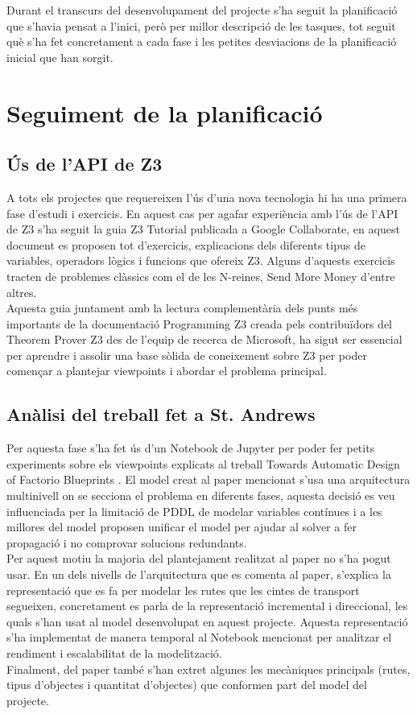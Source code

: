 Durant el transcurs del desenvolupament del projecte s'ha seguit la planificació que s'havia pensat a l'inici, però per millor descripció de les tasques, tot seguit què s'ha fet concretament a cada fase i les petites desviacions de la planificació inicial que han sorgit.

\section{Seguiment de la planificació}
\subsection{Ús de l'API de Z3}
A tots els projectes que requereixen l'ús d'una nova tecnologia hi ha una primera fase d'estudi i exercicis. En aquest cas per agafar experiència amb l'ús de l'API de Z3 s'ha seguit la guia Z3 Tutorial \cite{Z3Tutorial} publicada a Google Collaborate, en aquest document es proposen tot d'exercicis, explicacions dels diferents tipus de variables, operadors lògics i funcions que ofereix Z3. Alguns d'aquests exercicis tracten de problemes clàssics com el de les N-reines, Send More Money d'entre altres.\\
Aquesta guia juntament amb la lectura complementària dels punts més importants de la documentació Programming Z3 \cite{Z3Documentation} creada pels contribuïdors del Theorem Prover Z3 des de l'equip de recerca de Microsoft, ha sigut ser essencial per aprendre i assolir una base sòlida de coneixement sobre Z3 per poder començar a plantejar viewpoints i abordar el problema principal.

\subsection{Anàlisi del treball fet a St. Andrews}
Per aquesta fase s'ha fet ús d'un Notebook de Jupyter per poder fer petits experiments sobre els viewpoints explicats al treball Towards Automatic Design of Factorio Blueprints \cite{arxivpaper}. El model creat al paper mencionat s'usa una arquitectura multinivell on se secciona el problema en diferents fases, aquesta decisió es veu influenciada per la limitació de PDDL de modelar variables contínues i a les millores del model proposen unificar el model per ajudar al solver a fer propagació i no comprovar solucions redundants.\\
Per aquest motiu la majoria del plantejament realitzat al paper no s'ha pogut usar. En un dels nivells de l'arquitectura que es comenta al paper, s'explica la representació que es fa per modelar les rutes que les cintes de transport segueixen, concretament es parla de la representació incremental i direccional, les quals s'han usat al model desenvolupat en aquest projecte. Aquesta representació s'ha implementat de manera temporal al Notebook mencionat per analitzar el rendiment i escalabilitat de la modelització.\\
Finalment, del paper també s'han extret algunes les mecàniques principals (rutes, tipus d'objectes i quantitat d'objectes) que conformen part del model del projecte.

